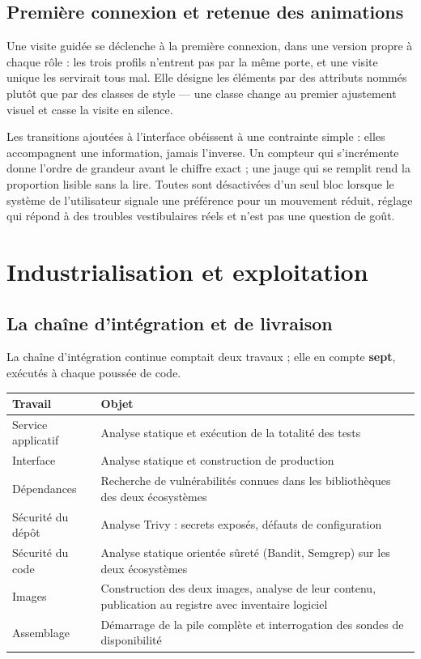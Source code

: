 \documentclass[11pt,a4paper]{article}
\begin{document}
\subsection{Première connexion et retenue des animations}
Une visite guidée se déclenche à la première connexion, dans une version propre à chaque rôle : les trois profils n'entrent pas par la même porte, et une visite unique les servirait tous mal. Elle désigne les éléments par des attributs nommés plutôt que par des classes de style --- une classe change au premier ajustement visuel et casse la visite en silence.

Les transitions ajoutées à l'interface obéissent à une contrainte simple : elles accompagnent une information, jamais l'inverse. Un compteur qui s'incrémente donne l'ordre de grandeur avant le chiffre exact ; une jauge qui se remplit rend la proportion lisible sans la lire. Toutes sont désactivées d'un seul bloc lorsque le système de l'utilisateur signale une préférence pour un mouvement réduit, réglage qui répond à des troubles vestibulaires réels et n'est pas une question de goût.

\section{Industrialisation et exploitation}\label{sec:industrialisation}

\subsection{La chaîne d'intégration et de livraison}
La chaîne d'intégration continue comptait deux travaux ; elle en compte \textbf{sept}, exécutés à chaque poussée de code.

\begin{center}
\small
\begin{tabular}{lp{8.6cm}}
  \toprule
  \textbf{Travail} & \textbf{Objet} \\
  \midrule
  Service applicatif & Analyse statique et exécution de la totalité des tests \\[1mm]
  Interface & Analyse statique et construction de production \\[1mm]
  Dépendances & Recherche de vulnérabilités connues dans les bibliothèques des deux écosystèmes \\[1mm]
  Sécurité du dépôt & Analyse Trivy : secrets exposés, défauts de configuration \\[1mm]
  Sécurité du code & Analyse statique orientée sûreté (Bandit, Semgrep) sur les deux écosystèmes \\[1mm]
  Images & Construction des deux images, analyse de leur contenu, publication au registre avec inventaire logiciel \\[1mm]
  Assemblage & Démarrage de la pile complète et interrogation des sondes de disponibilité \\
  \bottomrule
\end{tabular}
\end{center}
\end{document}
